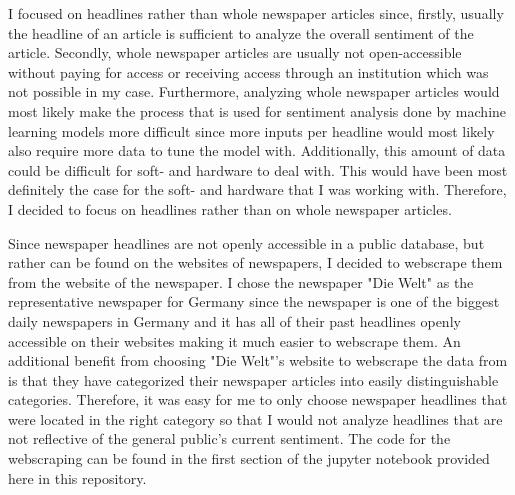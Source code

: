 \documentclass[11pt, a4paper, leqno]{article}
\begin{document}
I focused on headlines rather than whole newspaper articles since, firstly, usually the headline of an article is sufficient to analyze the overall sentiment of the article. Secondly, whole newspaper articles are usually not open-accessible without paying for access or receiving access through an institution which was not possible in my case. Furthermore, analyzing whole newspaper articles would most likely make the process that is used for sentiment analysis done by machine learning models more difficult since more inputs per headline would most likely also require more data to tune the model with. Additionally, this amount of data could be difficult for soft- and hardware to deal with. This would have been most definitely the case for the soft- and hardware that I was working with. Therefore, I decided to focus on headlines rather than on whole newspaper articles.

Since newspaper headlines are not openly accessible in a public database, but rather can be found on the websites of newspapers, I decided to webscrape them from the website of the newspaper. I chose the newspaper "Die Welt" as the representative newspaper for Germany since the newspaper is one of the biggest daily newspapers in Germany and it has all of their past headlines openly accessible on their websites making it much easier to webscrape them. An additional benefit from choosing "Die Welt"'s website to webscrape the data from is that they have categorized their newspaper articles into easily distinguishable categories. Therefore, it was easy for me to only choose newspaper headlines that were located in the right category so that I would not analyze headlines that are not reflective of the general public's current sentiment. The code for the webscraping can be found in the first section of the jupyter notebook provided here in this repository.
\end{document}
